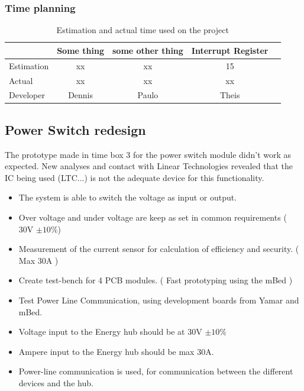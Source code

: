 \subsubsection{Time planning}
\begin{table}[H]
\centering
	\begin{tabular}{|l|c|c|c|c|}
		\hline
		~			& Some thing	& some other thing	& Interrupt Register\\ \hline
		Estimation	& xx			& xx				& 15				\\
		Actual		& xx			& xx				& xx				\\
		Developer	& Dennis		& Paulo				& Theis				\\
		\hline
	\end{tabular}
	\caption{Estimation and actual time used on the project}
\end{table}

\subsection{Power Switch redesign}
The prototype made in time box 3 for the power switch module didn't work as expected. New analyses and contact with Linear Technologies revealed that the IC being used (LTC...) is not the adequate device for this functionality.

\begin{itemize}
	\item The system is able to switch the voltage as input or output.
	\item Over voltage and under voltage are keep as set in common requirements ( 30V $ \pm10\% $)
	\item Measurement of the current sensor for calculation of efficiency and security. ( Max 30A )
	\item Create test-bench for 4 PCB modules. ( Fast prototyping using the mBed )
	\item Test Power Line Communication, using development boards from Yamar and mBed.
\end{itemize}
%
%
\begin{itemize}
	\item Voltage input to the Energy hub should be at 30V $ \pm10\% $
	\item Ampere input to the Energy hub should be max 30A.
	\item Power-line communication is used, for communication between the different devices and the hub.
\end{itemize}
